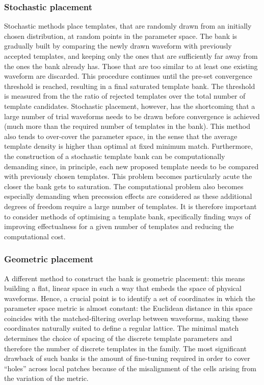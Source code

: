 \documentclass[binding=0.6cm, LaM]{sapthesis}
\begin{document}
\subsubsection{Stochastic placement}

	Stochastic methods place templates, 
	that are randomly drawn from an initially chosen distribution, 
	at random points in the parameter space.
	The bank is gradually built by comparing the newly drawn waveform
	with previously accepted templates, 
	and keeping only the ones that are sufficiently far away 
	from the ones the bank already has.
 	Those that are too similar to at least one existing waveform are discarded.
	This procedure continues until the pre-set convergence threshold is reached, 
	resulting in a final saturated template bank.
	The threshold is measured from the the ratio of rejected templates over the total number of template candidates.
	Stochastic placement, however, has the shortcoming that 
	a large number of trial waveforms needs to be drawn before convergence is achieved 
	(much more than the required number of templates in the bank). 
	This method also tends to over-cover the parameter space, 
	in the sense that the average template density is higher than optimal at fixed minimum match.
	Furthermore, the construction of a stochastic template bank 
	can be computationally demanding since, in principle, 
	each new proposed template needs to be compared 
	with previously chosen templates. 
	This problem becomes particularly acute 
	the closer the bank gets to saturation. 
	The computational problem also becomes especially demanding 
	when precession effects are considered as these additional degrees 
	of freedom require a large number of templates. 
	It is therefore important to consider methods of optimising a template bank, 
	specifically finding ways of improving effectualness for a given number 
	of templates and reducing the computational cost. 

\subsubsection{Geometric placement}


	A different method to construct the bank is geometric placement:
	this means building a flat, linear space in such a way that embeds the space of physical waveforms. 
	Hence, a crucial point is to identify a set of coordinates 
	in which the parameter space metric is almost constant: 
	the Euclidean distance in this space coincides with the matched-filtering overlap 
	between waveforms, making these coordinates naturally suited to define a regular lattice. 
	The minimal match determines the choice of spacing of the discrete template parameters 
	and therefore the number of discrete templates in the family.
	The most significant drawback of such banks is the amount of fine-tuning required 
	in order to cover “holes” across local patches because of the misalignment 
	of the cells arising from the variation of the metric. 
\end{document}
